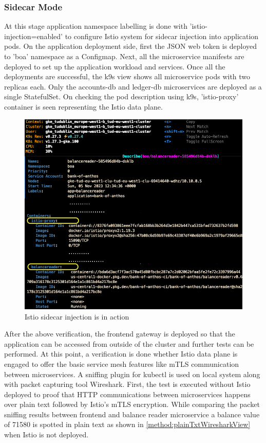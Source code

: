 \subsubsection{Sidecar Mode}
At this stage application namespace labelling is done with 'istio-injection=enabled' to configure Istio system for sidecar injection into application pods. On the application deployment side, first the JSON web token is deployed to 'boa' namespace as a Configmap. Next, all the microservice manifests are deployed to set up the application workload and services. Once all the deployments are successful, the k9s view shows all microservice pods with two replicas each. Only the accounts-db and ledger-db microservices are deployed as a single StatefulSet. On checking the pod description using k9s, 'istio-proxy' container is seen representing the Istio data plane.

\begin{figure}[ht!]
    \centering
    \includegraphics[width=1.0\linewidth]{resources/istio-sidecar-injection.png}
    \caption{Istio sidecar injection is in action}
    \label{method:istioSidecarInjectionView}
\end{figure}

After the above verification, the frontend gateway is deployed so that the application can be accessed from outside of the cluster and further tests can be performed. At this point, a verification is done whether Istio data plane is engaged to offer the basic service mesh features like mTLS communication between microservices. A sniffing plugin for kubectl is used on local system along with packet capturing tool Wireshark. First, the test is executed without Istio deployed to proof that HTTP communications between microservices happens over plain text followed by Istio's mTLS encryption. While comparing the packet sniffing results between frontend and balance reader microservice a balance value of 71580 is spotted in plain text as shown in \ref{method:plainTxtWiresharkView} when Istio is not deployed.

